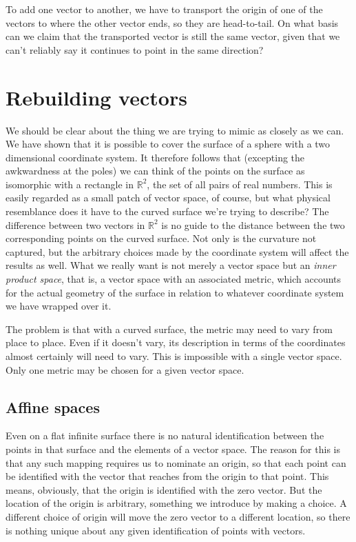 To add one vector to another, we have to transport the origin of one of the vectors to where the other vector ends, so they are head-to-tail. On what basis can we claim that the transported vector is still the same vector, given that we can't reliably say it continues to point in the same direction?

\section{Rebuilding vectors}

We should be clear about the thing we are trying to mimic as closely as we can. We have shown that it is possible to cover the surface of a sphere with a two dimensional coordinate system. It therefore follows that (excepting the awkwardness at the poles) we can think of the points on the surface as isomorphic with a rectangle in $\mathbb{R}^2$, the set of all pairs of real numbers. This is easily regarded as a small patch of vector space, of course, but what physical resemblance does it have to the curved surface we're trying to describe? The difference between two vectors in $\mathbb{R}^2$ is no guide to the distance between the two corresponding points on the curved surface. Not only is the curvature not captured, but the arbitrary choices made by the coordinate system will affect the results as well. What we really want is not merely a vector space but an \textit{inner product space}, that is, a vector space with an associated metric, which accounts for the actual geometry of the surface in relation to whatever coordinate system we have wrapped over it.

The problem is that with a curved surface, the metric may need to vary from place to place. Even if it doesn't vary, its description in terms of the coordinates almost certainly will need to vary. This is impossible with a single vector space. Only one metric may be chosen for a given vector space.

\subsection{Affine spaces}

Even on a flat infinite surface there is no natural identification between the points in that surface and the elements of a vector space. The reason for this is that any such mapping requires us to nominate an origin, so that each point can be identified with the vector that reaches from the origin to that point. This means, obviously, that the origin is identified with the zero vector. But the location of the origin is arbitrary, something we introduce by making a choice. A different choice of origin will move the zero vector to a different location, so there is nothing unique about any given identification of points with vectors.

